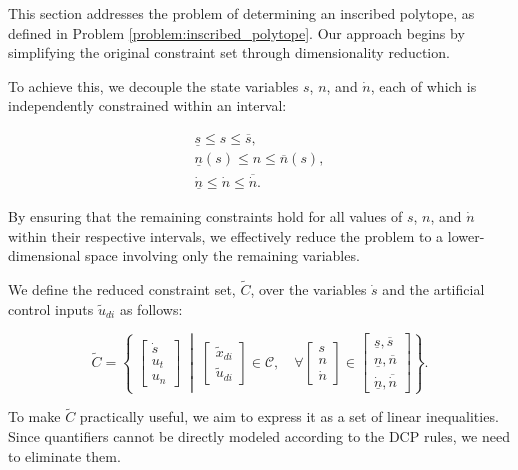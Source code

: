 This section addresses the problem of determining an inscribed polytope, as defined in Problem \ref{problem:inscribed_polytope}.
Our approach begins by simplifying the original constraint set through dimensionality reduction.

To achieve this, we decouple the state variables $s$, $n$, and $\dot{n}$, each of which is independently constrained within an interval:

\begin{align}
	\label{eq:state_constraints}
	\underline{s} \leq s \leq \overline{s},       \\
	\underline{n}(s) \leq n \leq \overline{n}(s), \\
	\underline{\dot{n}} \leq \dot{n} \leq \overline{\dot{n}}.
\end{align}

By ensuring that the remaining constraints hold for all values of $s$, $n$, and $\dot{n}$ within their respective intervals, we effectively reduce
the problem to a lower-dimensional space involving only the remaining variables.

We define the reduced constraint set, $\tilde{C}$, over the variables $\dot{s}$ and the artificial control inputs $\tilde{u}_{di}$ as follows:

\begin{equation}
	\tilde{C} =
	\left\{ \;
	\begin{bmatrix}
		\dot{s} \\
		u_t     \\
		u_n
	\end{bmatrix}
	\; \middle|\;
	\begin{bmatrix}
		\tilde{x}_{di} \\ \tilde{u}_{di}
	\end{bmatrix} \in \mathcal{C}, \quad \forall
	\begin{bmatrix}
		s \\
		n \\
		\dot{n}
	\end{bmatrix} \in
	\begin{bmatrix}
		\underline{s}, \overline{s} \\
		\underline{n}, \overline{n} \\
		\underline{\dot{n}}, \overline{\dot{n}}
	\end{bmatrix}
	\right\}.
	\label{eq:c_tilde}
\end{equation}

To make $\tilde{C}$ practically useful, we aim to express it as a set of linear inequalities.
Since quantifiers cannot be directly modeled according to the DCP rules, we need to eliminate them.

